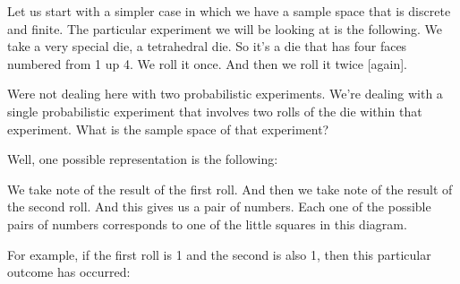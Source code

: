 \documentclass[pdftex, brazil, 12pt, twoside]{article}
\begin{document}
Let us start with a simpler case in which we have a sample
space that is discrete and finite.
The particular experiment we will be
looking at is the following.
We take a very special die, a tetrahedral die.
So it's a die that has four faces numbered from 1 up 4.
We roll it once.
And then we roll it twice [again].

Were not dealing here with two probabilistic experiments.
We're dealing with a single probabilistic experiment that
involves two rolls of the die within that experiment.
What is the sample space of that experiment?

Well, one possible
representation is the following:

\begin{figure}[H]
  \begin{center}
  \end{center}
\end{figure}

We take note of the result of the first roll.
And then we take note of the result of the second roll.
And this gives us a pair of numbers.
Each one of the possible pairs of numbers corresponds to one
of the little squares in this diagram.

For example, if the first roll is 1 and the second is also 1,
then this particular outcome has occurred:

\begin{figure}[H]
  \begin{center}
  \end{center}
\end{figure}
\end{document}
